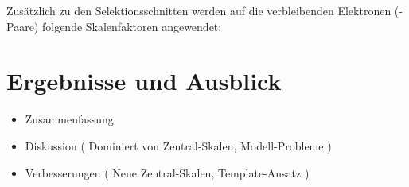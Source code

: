 Zusätzlich zu den Selektionsschnitten werden auf die verbleibenden Elektronen
(-Paare) folgende Skalenfaktoren angewendet:




%
\section{Ergebnisse und Ausblick}
\label{energy_calibration:ergebnisse_und_ausblick}
\begin{itemize}
    \item Zusammenfassung
    \item Diskussion ( Dominiert von Zentral-Skalen, Modell-Probleme )
    \item Verbesserungen ( Neue Zentral-Skalen, Template-Ansatz )
\end{itemize}


